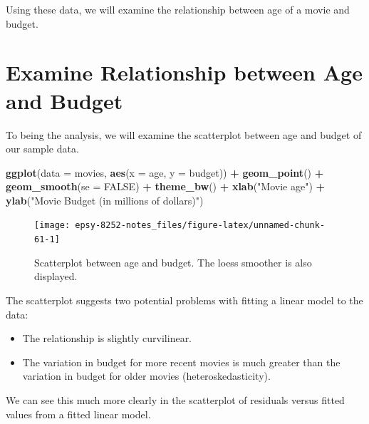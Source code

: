 \documentclass[]{book}
\newenvironment{Shaded}{\begin{snugshade}}{\end{snugshade}}
\newcommand{\DataTypeTok}[1]{\textcolor[rgb]{0.13,0.29,0.53}{#1}}
\newcommand{\KeywordTok}[1]{\textcolor[rgb]{0.13,0.29,0.53}{\textbf{#1}}}
\newcommand{\NormalTok}[1]{#1}
\newcommand{\OperatorTok}[1]{\textcolor[rgb]{0.81,0.36,0.00}{\textbf{#1}}}
\newcommand{\OtherTok}[1]{\textcolor[rgb]{0.56,0.35,0.01}{#1}}
\newcommand{\StringTok}[1]{\textcolor[rgb]{0.31,0.60,0.02}{#1}}
\providecommand{\tightlist}{%
  \setlength{\itemsep}{0pt}\setlength{\parskip}{0pt}}
\begin{document}
Using these data, we will examine the relationship between age of a movie and budget.

\hypertarget{examine-relationship-between-age-and-budget}{%
\section{Examine Relationship between Age and Budget}\label{examine-relationship-between-age-and-budget}}

To being the analysis, we will examine the scatterplot between age and budget of our sample data.

\begin{Shaded}
\begin{Highlighting}[]
\KeywordTok{ggplot}\NormalTok{(}\DataTypeTok{data =}\NormalTok{ movies, }\KeywordTok{aes}\NormalTok{(}\DataTypeTok{x =}\NormalTok{ age, }\DataTypeTok{y =}\NormalTok{ budget)) }\OperatorTok{+}
\StringTok{  }\KeywordTok{geom_point}\NormalTok{() }\OperatorTok{+}
\StringTok{  }\KeywordTok{geom_smooth}\NormalTok{(}\DataTypeTok{se =} \OtherTok{FALSE}\NormalTok{) }\OperatorTok{+}
\StringTok{  }\KeywordTok{theme_bw}\NormalTok{() }\OperatorTok{+}
\StringTok{  }\KeywordTok{xlab}\NormalTok{(}\StringTok{"Movie age"}\NormalTok{) }\OperatorTok{+}
\StringTok{  }\KeywordTok{ylab}\NormalTok{(}\StringTok{"Movie Budget (in millions of dollars)"}\NormalTok{)}
\end{Highlighting}
\end{Shaded}

\begin{figure}

{\centering \texttt{[image: epsy-8252-notes\_files/figure-latex/unnamed-chunk-61-1]} 

}

\caption{Scatterplot between age and budget. The loess smoother is also displayed.}\label{fig:unnamed-chunk-61}
\end{figure}

The scatterplot suggests two potential problems with fitting a linear model to the data:

\begin{itemize}
\tightlist
\item
  The relationship is slightly curvilinear.
\item
  The variation in budget for more recent movies is much greater than the variation in budget for older movies (heteroskedasticity).
\end{itemize}

We can see this much more clearly in the scatterplot of residuals versus fitted values from a fitted linear model.
\end{document}
